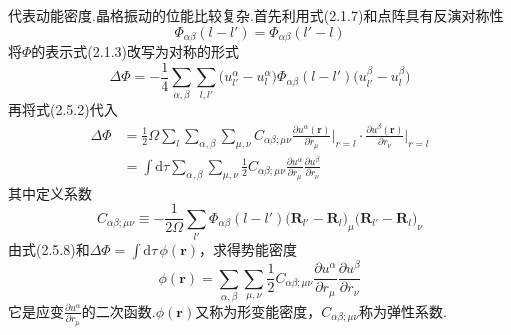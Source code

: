代表动能密度.晶格振动的位能比较复杂.首先利用式(2.1.7)和点阵具有反演对称性
\begin{equation}
  \Phi_{\alpha\beta}(l-l')=\Phi_{\alpha\beta}(l'-l)
\end{equation}
将$\Phi$的表示式(2.1.3)改写为对称的形式
\begin{equation}
  \Delta\Phi=-\frac{1}{4}\sum_{\alpha,\beta}\sum_{l,l'}
  \bigl(u_{l'}^{\alpha}-u_l^{\alpha}\bigr)\Phi_{\alpha\beta}(l-l')
  \bigl(u_{l'}^{\beta}-u_l^{\beta}\bigr)
\end{equation}
再将式(2.5.2)代入
\begin{equation}
\begin{aligned}
  \Delta\Phi&=\frac{1}{2}\Omega\sum_l\sum_{\alpha,\beta}\sum_{\mu,\nu}
  C_{\alpha\beta;\mu\nu}
  \frac{\partial u^{\alpha}(\boldsymbol{r})}{\partial r_{\mu}}\bigg|_{r=l}\cdot
  \frac{\partial u^{\beta}(\boldsymbol{r})}{\partial r_{\nu}}\bigg|_{r=l}\\
  &=\int\mathrm{d}\tau\sum_{\alpha,\beta}\sum_{\mu,\nu}
  \frac{1}{2}C_{\alpha\beta;\mu\nu}
  \frac{\partial u^{\alpha}}{\partial r_{\mu}}\frac{\partial u^{\beta}}{\partial r_{\nu}}
\end{aligned}
\end{equation}
其中定义系数
\begin{equation}
  C_{\alpha\beta;\mu\nu}\equiv-\frac{1}{2\Omega}\sum_{l'}
  \Phi_{\alpha\beta}(l-l')
  \bigl(\boldsymbol{R}_{l'}-\boldsymbol{R}_l\bigr)_{\mu}
  \bigl(\boldsymbol{R}_{l'}-\boldsymbol{R}_l\bigr)_{\nu}
\end{equation}
由式(2.5.8)和$\Delta\Phi=\int\mathrm{d}\tau\,\phi(\boldsymbol{r})$，求得势能密度
\begin{equation}
  \phi(\boldsymbol{r})=\sum_{\alpha,\beta}\sum_{\mu,\nu}
  \frac{1}{2}C_{\alpha\beta;\mu\nu}
  \frac{\partial u^{\alpha}}{\partial r_{\mu}}\frac{\partial u^{\beta}}{\partial r_{\nu}}
\end{equation}
它是应变$\frac{\partial u^{\alpha}}{\partial r_{\mu}}$的二次函数.$\phi(\boldsymbol{r})$又称为形变能密度，$C_{\alpha\beta;\mu\nu}$称为弹性系数.

